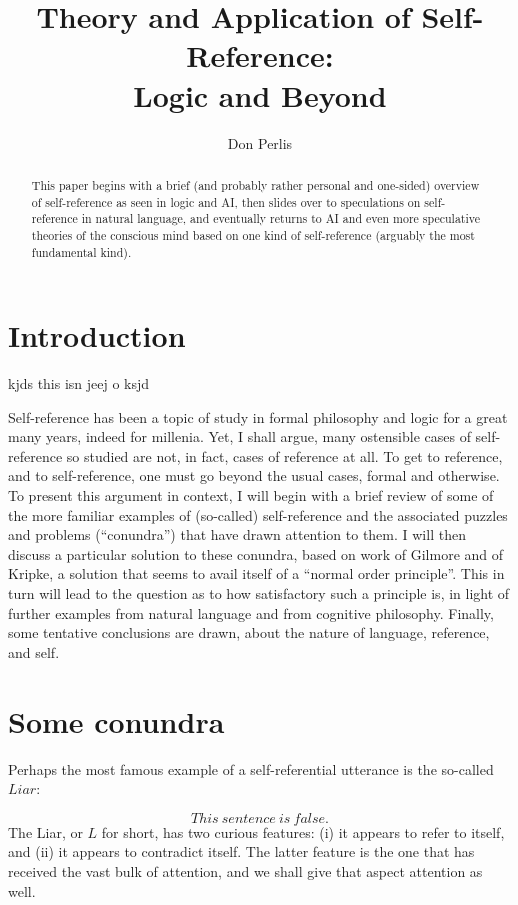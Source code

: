 \documentclass{amsart}
\title{\bf Theory and Application of Self-Reference:\\Logic and Beyond}
\author{Don Perlis}
\begin{document}
\begin{abstract}
This paper begins with a brief (and probably rather personal and
one-sided) overview of self-reference as seen in logic and AI, then
slides over to speculations on self-reference in natural language,
and eventually returns to AI and even more speculative theories of the
conscious mind based on one kind of self-reference (arguably the most
fundamental kind). 
\end{abstract}

\maketitle


\section{Introduction}

kjds this isn  jeej o ksjd

Self-reference has been a topic of study in formal philosophy and
logic for a great many years, indeed for millenia.  Yet, I shall
argue, many ostensible cases of self-reference so studied are not, in
fact, cases of reference at all. To get to reference, and to
self-reference, one must go beyond the usual cases, formal and
otherwise. To present this argument in context,
I will begin with a brief review of some of the more familiar examples
of (so-called) self-reference and the associated puzzles and problems
(``conundra'') that have drawn attention to them.  I will then discuss
a particular solution to these conundra, based on work of Gilmore and
of Kripke, a solution that seems to avail itself of a ``normal order
principle''.  This in turn will lead to the question as to how
satisfactory such a principle is, in light of further examples from
natural language and from cognitive philosophy. Finally, some
tentative conclusions are drawn, about the nature of language,
reference, and self.


\section{Some conundra}
Perhaps the most famous example of a self-referential utterance is
the so-called $Liar$:

$$This~ sentence~ is~ false.$$
\smallskip
\noindent
The Liar, or $L$ for short, has two curious features: (i)
it appears to refer to itself, and (ii) it appears to contradict
itself. The latter feature is the one that has received the vast bulk
of attention, and we shall give that aspect attention as well.
\end{document}

